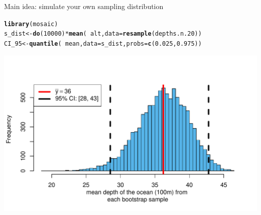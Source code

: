 \documentclass[handout]{beamer}\usepackage[]{graphicx}\usepackage[]{color}
\newcommand{\hlnum}[1]{\textcolor[rgb]{0.686,0.059,0.569}{#1}}%
\newcommand{\hlopt}[1]{\textcolor[rgb]{0,0,0}{#1}}%
\newcommand{\hlstd}[1]{\textcolor[rgb]{0.345,0.345,0.345}{#1}}%
\newcommand{\hlkwb}[1]{\textcolor[rgb]{0.69,0.353,0.396}{#1}}%
\newcommand{\hlkwc}[1]{\textcolor[rgb]{0.333,0.667,0.333}{#1}}%
\newcommand{\hlkwd}[1]{\textcolor[rgb]{0.737,0.353,0.396}{\textbf{#1}}}%
\newenvironment{knitrout}{}{} %
\begin{document}
\begin{frame}[fragile]{Main idea: simulate your own sampling distribution}



\begin{knitrout}\scriptsize
{}\color{fgcolor}
\begin{alltt}
\hlkwd{library}\hlstd{(mosaic)}
\hlstd{s_dist} \hlkwb{<-} \hlkwd{do}\hlstd{(}\hlnum{10000}\hlstd{)} \hlopt{*} \hlkwd{mean}\hlstd{(} \hlopt{~} \hlstd{alt,} \hlkwc{data} \hlstd{=} \hlkwd{resample}\hlstd{(depths.n.20))}
\hlstd{CI_95} \hlkwb{<-} \hlkwd{quantile}\hlstd{(}\hlopt{~} \hlstd{mean,} \hlkwc{data} \hlstd{= s_dist,} \hlkwc{probs} \hlstd{=} \hlkwd{c}\hlstd{(}\hlnum{0.025}\hlstd{,} \hlnum{0.975}\hlstd{))}
\end{alltt}


{\centering \includegraphics[width=1\linewidth]{figure/unnamed-chunk-7-1} 

}



\end{knitrout}

\end{frame}
\end{document}

